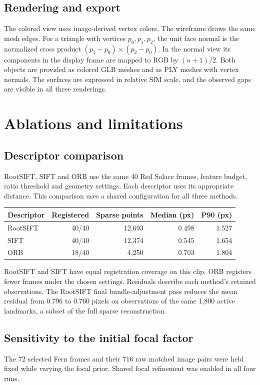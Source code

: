 \documentclass[11pt,a4paper]{article}
\begin{document}
\subsection{Rendering and export}
The colored view uses image-derived vertex colors. The wireframe draws the
same mesh edges. For a triangle with vertices \(p_0,p_1,p_2\), the unit face
normal is the normalized cross product
\((p_1-p_0)\times(p_2-p_0)\). In the normal view its components in the
display frame are mapped to RGB by \((n+1)/2\). Both objects are provided
as colored GLB meshes and as PLY meshes with vertex normals. The surfaces
are expressed in relative SfM scale, and the observed gaps are visible
in all three renderings.

\clearpage
\section{Ablations and limitations}
\subsection{Descriptor comparison}
RootSIFT, SIFT and ORB use the same 40 Red Solace frames, feature budget,
ratio threshold and geometry settings. Each descriptor uses its appropriate
distance. This comparison uses a shared configuration for all three methods.

\begin{center}
\small
\begin{tabularx}{\linewidth}{@{}Yrrrr@{}}
\toprule
\textbf{Descriptor} & \textbf{Registered} & \textbf{Sparse points} &
\textbf{Median (px)} & \textbf{P90 (px)}\\
\midrule
RootSIFT & 40/40 & 12,693 & 0.498 & 1.527\\
SIFT     & 40/40 & 12,374 & 0.545 & 1.654\\
ORB      & 18/40 & 4,250  & 0.703 & 1.804\\
\bottomrule
\end{tabularx}
\end{center}

RootSIFT and SIFT have equal registration coverage on this clip. ORB
registers fewer frames under the chosen settings. Residuals describe each
method's retained observations. The RootSIFT final bundle-adjustment pass
reduces the mean residual from 0.796 to 0.760 pixels on observations of the
same 1,800 active landmarks, a subset of the full sparse reconstruction.

\subsection{Sensitivity to the initial focal factor}
The 72 selected Fern frames and their 716 raw matched image pairs were held
fixed while varying the focal prior. Shared focal refinement was enabled
in all four runs.
\end{document}
